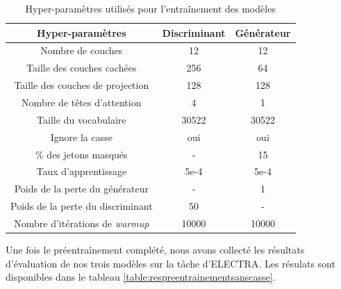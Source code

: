 \documentclass[12pt,twoside,maitrise]{dms}
\theoremstyle{definition}
\numberwithin{equation}{section}
\numberwithin{table}{chapter}
\numberwithin{figure}{chapter}
\begin{document}
\begin{table}[h!]
	\centering
	\begin{tabular}{||c | c c||}
		\hline
		Hyper-paramètres                       & Discriminant & Générateur \\ [0.5ex]
		\hline\hline
		Nombre de couches                      & 12           & 12         \\
		Taille des couches cachées             & 256          & 64         \\
		Taille des couches de projection       & 128          & 128        \\
		Nombre de têtes d'attention            & 4            & 1          \\
		Taille du vocabulaire                  & 30522        & 30522      \\
		Ignore la casse                        & oui          & oui        \\
		\% des jetons masqués                  & -            & 15         \\
		Taux d'apprentissage                   & 5e-4         & 5e-4       \\
		Poids de la perte du générateur        & -            & 1          \\
		Poids de la perte du discriminant      & 50           & -          \\
		Nombre d'itérations de \textit{warmup} & 10000        & 10000      \\
		\hline
	\end{tabular}
	\caption{Hyper-paramètres utilisés pour l'entraînement des modèles}
	\label{table:pre-entr-hp}
\end{table}

Une fois le préentraînement complété, nous avons collecté les résultats
d'évaluation de nos trois modèles sur la tâche d'ELECTRA. Les résulats sont disponibles dans le tableau \ref{table:respreentrainementsanscasse}. \\
\end{document}
